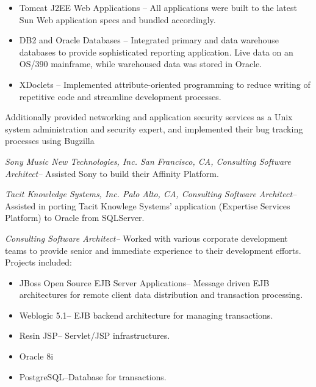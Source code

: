\documentclass[10pt]{report}
\begin{document}
\begin{description}
\begin{list}{-}{}
\begin{itemize}
				\item{Tomcat J2EE Web Applications --}  All applications were built to the latest Sun Web application specs and bundled accordingly.

				\item{DB2 and Oracle Databases --}  Integrated primary and data warehouse databases to provide sophisticated reporting application.  Live data on an OS/390 mainframe, while warehoused data was stored in Oracle.

				\item{XDoclets --}  Implemented attribute-oriented programming to reduce writing of repetitive code and streamline development processes.

			\end{itemize}

			Additionally provided networking and application security services as a Unix system administration and security expert, and implemented their bug tracking processes using Bugzilla

			\item{\emph{Sony Music New Technologies, Inc. San Francisco, CA, Consulting Software Architect--}}  Assisted Sony to build their Affinity Platform.

			\item{\emph{Tacit Knowledge Systems, Inc. Palo Alto, CA, Consulting Software Architect--}}  Assisted in porting Tacit Knowlege Systems' application (Expertise Services Platform) to Oracle from SQLServer.

			\item{\emph{Consulting Software Architect--}}  Worked with various corporate development teams to provide senior and immediate experience to their development efforts.  Projects included:

			\begin{itemize}

				\item{JBoss Open Source EJB Server Applications--} Message driven EJB architectures for remote client data distribution and transaction processing.

				\item{Weblogic 5.1--} EJB backend architecture for managing transactions.

				\item{Resin JSP--} Servlet/JSP infrastructures.

				\item{Oracle 8i}

				\item{PostgreSQL--}Database for transactions.


\end{itemize}
\end{list}
\end{description}
\end{document}
